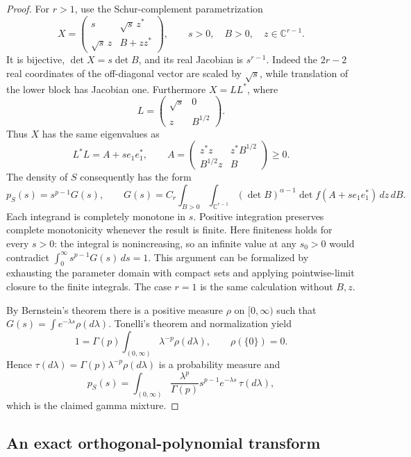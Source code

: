 \documentclass[11pt,a4paper]{article}
\theoremstyle{definition}
\theoremstyle{remark}
\numberwithin{equation}{section}
\begin{document}
\begin{proof}
For $r>1$, use the Schur-complement parametrization
\begin{equation}\label{ya:schur}
 X=\begin{pmatrix}
 s&\sqrt{s}\,z^*\\
 \sqrt{s}\,z&B+zz^*
 \end{pmatrix},\qquad
 s>0,\quad B>0,\quad z\in\mathbb C^{r-1}.
\end{equation}
It is bijective, $\det X=s\det B$, and its real Jacobian is
$s^{r-1}$. Indeed the $2r-2$ real coordinates of the off-diagonal
vector are scaled by $\sqrt s$, while translation of the lower block
has Jacobian one. Furthermore $X=LL^*$, where
\[
 L=\begin{pmatrix}\sqrt s&0\\z&B^{1/2}\end{pmatrix}.
\]
Thus $X$ has the same eigenvalues as
\[
 L^*L=A+s e_1e_1^*,\qquad
 A=\begin{pmatrix}
 z^*z&z^*B^{1/2}\\B^{1/2}z&B
 \end{pmatrix}\ge0.
\]
The density of $S$ consequently has the form
\begin{equation}\label{ya:marginal-density}
 p_S(s)=s^{p-1}G(s),\qquad
 G(s)=C_r\int_{B>0}\int_{\mathbb C^{r-1}}
       (\det B)^{\alpha-1}\det f(A+s e_1e_1^*)\,dz\,dB.
\end{equation}
Each integrand is completely monotone in $s$. Positive integration
preserves complete monotonicity whenever the result is finite. Here
finiteness holds for every $s>0$: the integral is nonincreasing, so an
infinite value at any $s_0>0$ would contradict
$\int_0^\infty s^{p-1}G(s)\,ds=1$.
This argument can be formalized by exhausting the parameter domain
with compact sets and applying pointwise-limit closure to the finite
integrals. The case $r=1$ is the same calculation without $B,z$.

By Bernstein's theorem there is a positive measure $\rho$ on
$[0,\infty)$ such that
$G(s)=\int e^{-\lambda s}\rho(d\lambda)$.
Tonelli's theorem and normalization yield
\[
 1=\Gamma(p)\int_{(0,\infty)}\lambda^{-p}\rho(d\lambda),
 \qquad \rho(\{0\})=0.
\]
Hence $\tau(d\lambda)=\Gamma(p)\lambda^{-p}\rho(d\lambda)$ is a
probability measure and
\[
 p_S(s)=\int_{(0,\infty)}
       \frac{\lambda^p}{\Gamma(p)}s^{p-1}e^{-\lambda s}
       \,\tau(d\lambda),
\]
which is the claimed gamma mixture.
\end{proof}

\subsection{An exact orthogonal-polynomial transform}
\end{document}
